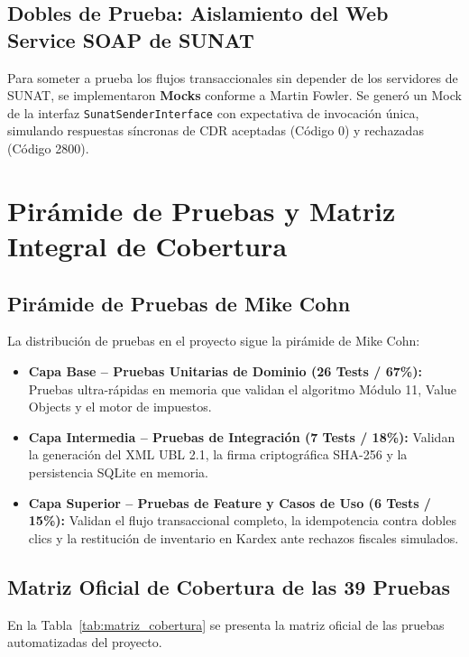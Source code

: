 \documentclass[11pt,a4paper]{article}
\begin{document}
\subsection{Dobles de Prueba: Aislamiento del Web Service SOAP de SUNAT}
Para someter a prueba los flujos transaccionales sin depender de los servidores de SUNAT, se implementaron \textbf{Mocks} conforme a Martin Fowler. Se generó un Mock de la interfaz \texttt{SunatSenderInterface} con expectativa de invocación única, simulando respuestas síncronas de CDR aceptadas (Código 0) y rechazadas (Código 2800).

\section{Pirámide de Pruebas y Matriz Integral de Cobertura}

\subsection{Pirámide de Pruebas de Mike Cohn}
La distribución de pruebas en el proyecto sigue la pirámide de Mike Cohn:
\begin{itemize}[noitemsep]
    \item \textbf{Capa Base -- Pruebas Unitarias de Dominio (26 Tests / 67\%):} Pruebas ultra-rápidas en memoria que validan el algoritmo Módulo 11, Value Objects y el motor de impuestos.
    \item \textbf{Capa Intermedia -- Pruebas de Integración (7 Tests / 18\%):} Validan la generación del XML UBL 2.1, la firma criptográfica SHA-256 y la persistencia SQLite en memoria.
    \item \textbf{Capa Superior -- Pruebas de Feature y Casos de Uso (6 Tests / 15\%):} Validan el flujo transaccional completo, la idempotencia contra dobles clics y la restitución de inventario en Kardex ante rechazos fiscales simulados.
\end{itemize}

\subsection{Matriz Oficial de Cobertura de las 39 Pruebas}
En la Tabla~\ref{tab:matriz_cobertura} se presenta la matriz oficial de las pruebas automatizadas del proyecto.
\end{document}
